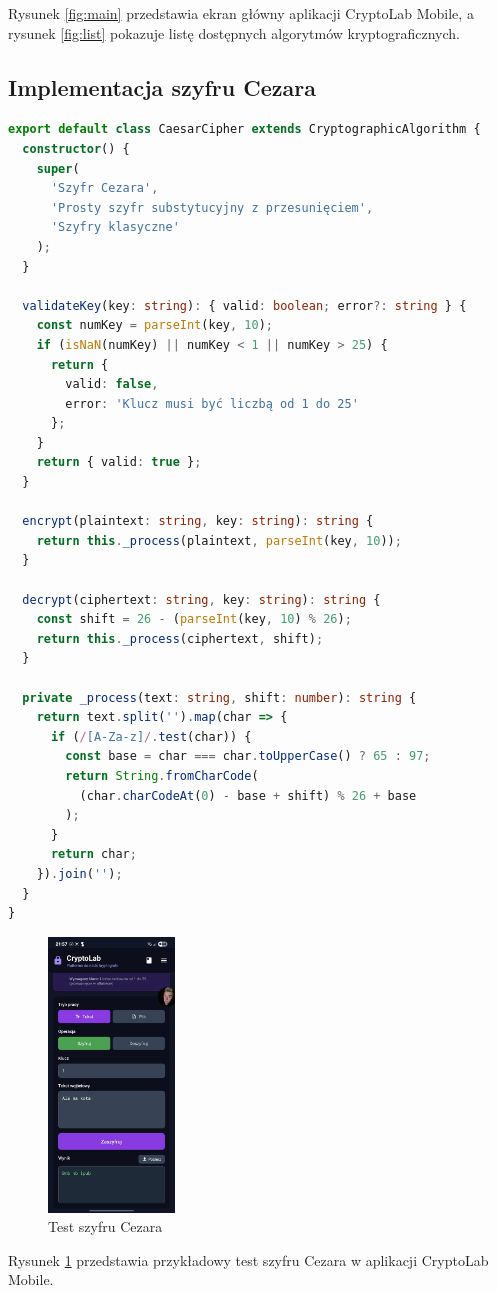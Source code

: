 \documentclass[12pt,a4paper]{article}
\begin{document}
Rysunek \ref{fig:main} przedstawia ekran główny aplikacji CryptoLab Mobile, a rysunek \ref{fig:list} pokazuje listę dostępnych algorytmów kryptograficznych.
\subsection{Implementacja szyfru Cezara}
\begin{lstlisting}[language=TypeScript, caption={Szczegóły implementacji CaesarCipher}]
export default class CaesarCipher extends CryptographicAlgorithm {
  constructor() {
    super(
      'Szyfr Cezara',
      'Prosty szyfr substytucyjny z przesunięciem',
      'Szyfry klasyczne'
    );
  }

  validateKey(key: string): { valid: boolean; error?: string } {
    const numKey = parseInt(key, 10);
    if (isNaN(numKey) || numKey < 1 || numKey > 25) {
      return { 
        valid: false, 
        error: 'Klucz musi być liczbą od 1 do 25' 
      };
    }
    return { valid: true };
  }

  encrypt(plaintext: string, key: string): string {
    return this._process(plaintext, parseInt(key, 10));
  }

  decrypt(ciphertext: string, key: string): string {
    const shift = 26 - (parseInt(key, 10) % 26);
    return this._process(ciphertext, shift);
  }

  private _process(text: string, shift: number): string {
    return text.split('').map(char => {
      if (/[A-Za-z]/.test(char)) {
        const base = char === char.toUpperCase() ? 65 : 97;
        return String.fromCharCode(
          (char.charCodeAt(0) - base + shift) % 26 + base
        );
      }
      return char;
    }).join('');
  }
}
\end{lstlisting}
\begin{figure}[H]
    \centering
    \includegraphics[width=0.3\textwidth]{img/test_cezara.jpg}
    \caption{Test szyfru Cezara}
    \label{fig:testc}
\end{figure}
Rysunek \ref{fig:testc} przedstawia przykładowy test szyfru Cezara w aplikacji CryptoLab Mobile.
\end{document}
